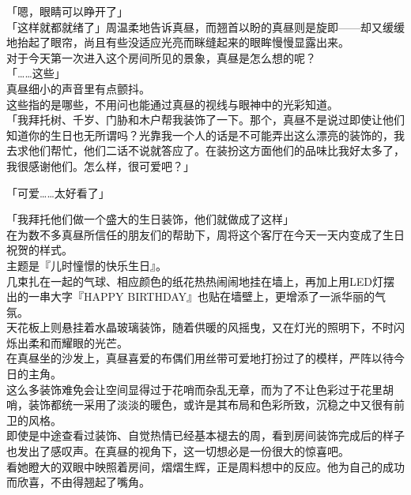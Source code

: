 「嗯，眼睛可以睁开了」\\

「这样就都就绪了」周温柔地告诉真昼，而翘首以盼的真昼则是旋即——却又缓缓地抬起了眼帘，尚且有些没适应光亮而眯缝起来的眼眸慢慢显露出来。\\

对于今天第一次进入这个房间所见的景象，真昼是怎么想的呢？\\

「……这些」\\

真昼细小的声音里有点颤抖。\\

这些指的是哪些，不用问也能通过真昼的视线与眼神中的光彩知道。\\

「我拜托树、千岁、门胁和木户帮我装饰了一下。那个，真昼不是说过即使让他们知道你的生日也无所谓吗？光靠我一个人的话是不可能弄出这么漂亮的装饰的，我去求他们帮忙，他们二话不说就答应了。在装扮这方面他们的品味比我好太多了，我很感谢他们。怎么样，很可爱吧？」

「可爱……太好看了」

「我拜托他们做一个盛大的生日装饰，他们就做成了这样」\\

在为数不多真昼所信任的朋友们的帮助下，周将这个客厅在今天一天内变成了生日祝贺的样式。\\

主题是『儿时憧憬的快乐生日』。\\

几束扎在一起的气球、相应颜色的纸花热热闹闹地挂在墙上，再加上用LED灯摆出的一串大字『HAPPY BIRTHDAY』也贴在墙壁上，更增添了一派华丽的气氛。\\

天花板上则悬挂着水晶玻璃装饰，随着供暖的风摇曳，又在灯光的照明下，不时闪烁出柔和而耀眼的光芒。\\

在真昼坐的沙发上，真昼喜爱的布偶们用丝带可爱地打扮过了的模样，严阵以待今日的主角。\\

这么多装饰难免会让空间显得过于花哨而杂乱无章，而为了不让色彩过于花里胡哨，装饰都统一采用了淡淡的暖色，或许是其布局和色彩所致，沉稳之中又很有前卫的风格。\\

即使是中途查看过装饰、自觉热情已经基本褪去的周，看到房间装饰完成后的样子也发出了感叹声。在真昼的视角下，这一切想必是一份很大的惊喜吧。\\

看她瞪大的双眼中映照着房间，熠熠生辉，正是周料想中的反应。他为自己的成功而欣喜，不由得翘起了嘴角。\\

